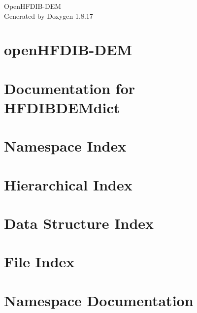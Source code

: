 \let\mypdfximage\pdfximage\def\pdfximage{\immediate\mypdfximage}\documentclass[twoside]{book}
\newcommand{\+}{\discretionary{\mbox{\scriptsize$\hookleftarrow$}}{}{}}
\newcommand{\clearemptydoublepage}{%
  \newpage{\pagestyle{empty}\cleardoublepage}%
}
\begin{document}
\hypersetup{pageanchor=false,
             bookmarksnumbered=true,
             pdfencoding=unicode
            }
\begin{titlepage}
\vspace*{7cm}
\begin{center}%
{\Large Open\+H\+F\+D\+I\+B-\/\+D\+EM }\\
\vspace*{1cm}
{\large Generated by Doxygen 1.8.17}\\
\end{center}
\end{titlepage}
\clearemptydoublepage
{}
\tableofcontents
\clearemptydoublepage
{}
\hypersetup{pageanchor=true}

\chapter{open\+H\+F\+D\+I\+B-\/\+D\+EM}
\label{md_README}

\chapter{Documentation for H\+F\+D\+I\+B\+D\+E\+Mdict}
\label{md_User_Guide}

\chapter{Namespace Index}

\chapter{Hierarchical Index}

\chapter{Data Structure Index}

\chapter{File Index}

\chapter{Namespace Documentation}



\end{document}
